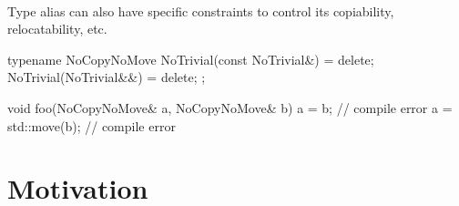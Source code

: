\documentclass{article}
\begin{document}
\paragraph{}
Type alias can also have specific constraints to control its copiability, relocatability, etc.
\begin{codeblock}
typename NoCopyNoMove {
  NoTrivial(const NoTrivial&) = delete;
  NoTrivial(NoTrivial&&) = delete;
};

void foo(NoCopyNoMove& a, NoCopyNoMove& b) {
  a = b; // compile error
  a = std::move(b); // compile error
}
\end{codeblock}



\section{Motivation}
\end{document}
